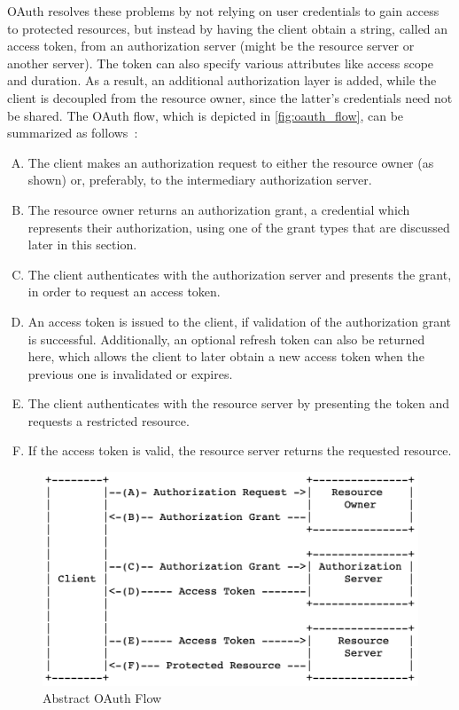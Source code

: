 OAuth resolves these problems by not relying on user credentials to gain access to protected resources, but instead by having the client obtain a string, called an access token, from an authorization server (might be the resource server or another server).  The token can also specify various attributes like access scope and duration. As a result, an additional authorization layer is added, while the client is decoupled from the resource owner, since the latter's credentials need not be shared. The OAuth flow, which is depicted in \autoref{fig:oauth_flow}, can be summarized as follows~\cite{oauth}:

\begin{enumerate} [(A)]
    \item The client makes an authorization request to either the resource owner  (as shown) or, preferably, to the intermediary authorization server.

    \item The resource owner returns an authorization grant, a credential which represents their authorization, using one of the grant types that are discussed later in this section.

    \item The client authenticates with the authorization server and presents the grant, in order to request an access token.

    \item An access token is issued to the client, if validation of the authorization grant is successful. Additionally, an optional refresh token can also be returned here, which allows the client to later obtain a new access token when the previous one is invalidated or expires.

    \item  The client authenticates with the resource server by presenting the token and requests a restricted resource.

    \item If the access token is valid, the resource server returns the requested resource.
\end{enumerate}

\begin{figure} [h]
    \centering
    \includegraphics[scale=0.7]{images/oauth_flow}
    \caption{\label{fig:oauth_flow}Abstract OAuth Flow}
\end{figure}

